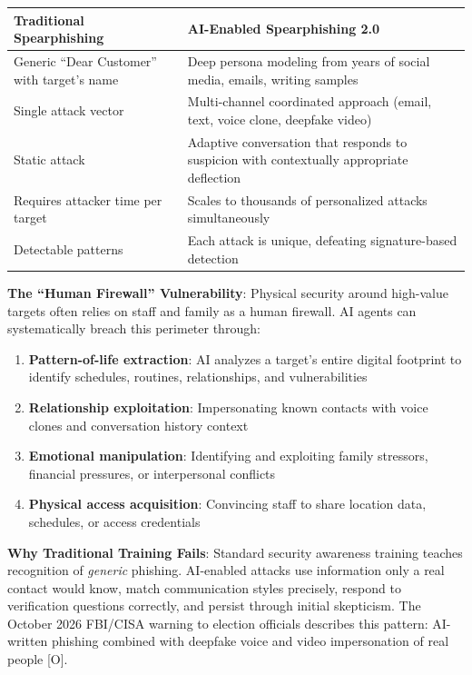 \documentclass[11pt,letterpaper]{article}
\begin{document}
\begin{center}
\small
\begin{tabular}{L{5cm}L{7.5cm}}
\toprule
\textbf{Traditional Spearphishing} & \textbf{AI-Enabled Spearphishing 2.0} \\
\midrule
Generic ``Dear Customer'' with target's name & Deep persona modeling from years of social media, emails, writing samples \\
Single attack vector & Multi-channel coordinated approach (email, text, voice clone, deepfake video) \\
Static attack & Adaptive conversation that responds to suspicion with contextually appropriate deflection \\
Requires attacker time per target & Scales to thousands of personalized attacks simultaneously \\
Detectable patterns & Each attack is unique, defeating signature-based detection \\
\bottomrule
\end{tabular}
\end{center}

\textbf{The ``Human Firewall'' Vulnerability}: Physical security around high-value targets often relies on staff and family as a human firewall. AI agents can systematically breach this perimeter through:

\begin{enumerate}
  \item \textbf{Pattern-of-life extraction}: AI analyzes a target's entire digital footprint to identify schedules, routines, relationships, and vulnerabilities
  \item \textbf{Relationship exploitation}: Impersonating known contacts with voice clones and conversation history context
  \item \textbf{Emotional manipulation}: Identifying and exploiting family stressors, financial pressures, or interpersonal conflicts
  \item \textbf{Physical access acquisition}: Convincing staff to share location data, schedules, or access credentials
\end{enumerate}

\textbf{Why Traditional Training Fails}: Standard security awareness training teaches recognition of \textit{generic} phishing. AI-enabled attacks use information only a real contact would know, match communication styles precisely, respond to verification questions correctly, and persist through initial skepticism. The October 2026 FBI/CISA warning to election officials describes this pattern: AI-written phishing combined with deepfake voice and video impersonation of real people [O].
\end{document}
